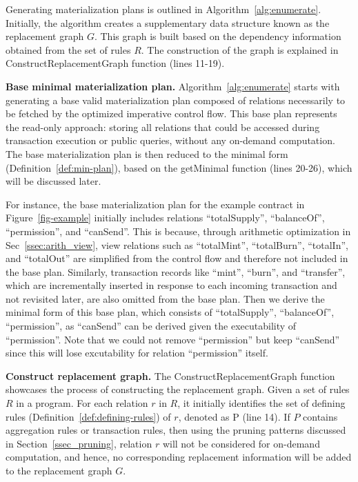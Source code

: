 Generating materialization plans is outlined in Algorithm~\ref{alg:enumerate}. 
Initially, the algorithm creates a supplementary data structure known as the replacement graph $G$. 
This graph is built based on the dependency information obtained from the set of rules $R$. 
The construction of the graph is explained in 
{\sf ConstructReplacementGraph} function (lines 11-19).

\noindent \textbf{Base minimal materialization plan.}
Algorithm~\ref{alg:enumerate} starts with generating a base valid materialization plan composed of relations necessarily to be fetched by the optimized imperative control flow. This base plan represents the read-only approach: storing all relations that could be accessed during transaction execution or public queries, without any on-demand computation. The base materialization plan is then reduced to the minimal form (Definition~\ref{def:min-plan}), based on the {\sf getMinimal} function (lines 20-26), which will be discussed later.

For instance, the base materialization plan for the example contract in Figure~\ref{fig-example} initially includes relations {\sf “totalSupply”}, {\sf “balanceOf”}, {\sf “permission”}, and {\sf “canSend”}. This is because, through arithmetic optimization in Sec~\ref{ssec:arith_view}, view relations such as {\sf “totalMint”}, {\sf “totalBurn”}, {\sf “totalIn”}, and {\sf “totalOut”} are simplified from the control flow and therefore not included in the base plan. Similarly, transaction records like {\sf “mint”}, {\sf “burn”}, and {\sf “transfer”}, which are incrementally inserted in response to each incoming transaction and not revisited later, are also omitted from the base plan. Then we derive the minimal form of this base plan, which consists of {\sf “totalSupply”}, {\sf “balanceOf”}, {\sf “permission”}, as {\sf “canSend”} can be derived given the executability of {\sf “permission”}. Note that we could not remove {\sf “permission”} but keep {\sf “canSend”} since this will lose excutability for relation {\sf “permission”} itself.


\noindent \textbf{Construct replacement graph.}
The {\sf ConstructReplacementGraph} function showcases the process of constructing the replacement graph. 
Given a set of rules $R$ in a \base program. For each relation $r$ in $R$, it initially identifies the set of defining rules (Definition~\ref{def:defining-rules}) of $r$, denoted as P (line 14). 
If $P$ contains aggregation rules or transaction rules, then using the pruning patterns discussed in Section~\ref{ssec_pruning}, relation $r$ will not be considered for on-demand computation, and hence, no corresponding replacement information will be added to the replacement graph $G$.

